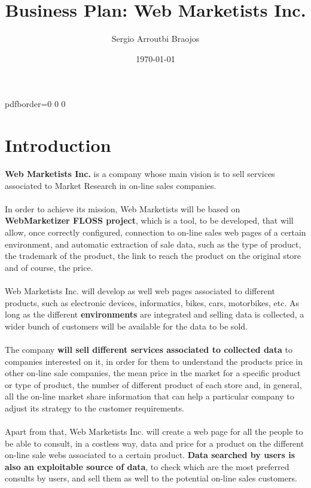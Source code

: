 \documentclass[11pt]{article}
\title{\textbf{Business Plan: Web Marketists Inc.}}
\author{Sergio Arroutbi Braojos}
\date{\today}
\begin{document}
\hypersetup
{   
pdfborder={0 0 0}
}

\maketitle

\tableofcontents

\section{Introduction}
\textbf{Web Marketists Inc.} is a company whose main vision is to sell services associated to Market Research in on-line sales companies.\\
\\
In order to achieve its mission, Web Marketists will be based on \textbf{WebMarketizer FLOSS project}, which is a tool, to be developed, that will allow, once correctly configured, connection to on-line sales web pages of a certain environment, and automatic extraction of sale data, such as the type of product, the trademark of the product, the link to reach the product on the original store and of course, the price.\\
\\
Web Marketists Inc. will develop as well web pages   associated to different products, such as electronic devices, informatics, bikes, cars, motorbikes, etc. As long as the different \textbf{environments} are integrated and selling data is collected, a wider bunch of customers will be available for the data to be sold.\\
\\
The company \textbf{will sell different services associated to collected data} to companies interested on it, in order for them to understand the products price in other on-line sale companies, the mean price in the market for a specific product or type of product, the number of different product of each store and, in general, all the on-line market share information that can help a particular company to adjust its strategy to the customer requirements.\\
\\
Apart from that, Web Marketists Inc. will create a web page for all the people to be able to consult, in a costless way, data and price for a product on the different on-line sale webs associated to a certain product. \textbf{Data searched by users is also an exploitable source of data}, to check which are the most preferred consults by users, and sell them as well to the potential on-line sales customers.
\end{document}
